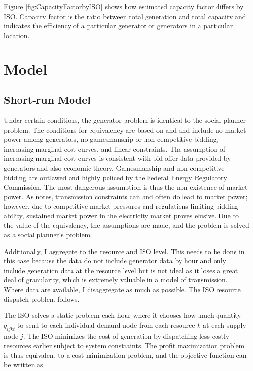 \documentclass[12pt]{article}
\begin{document}
Figure \ref{fig:CapacityFactorbyISO} shows how estimated capacity factor differs by ISO. Capacity factor is the ratio between total generation and total capacity and indicates the efficiency of a particular generator or generators in a particular location.

\section{Model} \label{sec:Model}

\subsection{Short-run Model}

Under certain conditions, the generator problem is identical to the social planner problem. The conditions for equivalency are based on \cite{gilbert2004allocating} and \cite{cramton2017electricity} and include no market power among generators, no gamesmanship or non-competitive bidding, increasing marginal cost curves, and linear constraints. The assumption of increasing marginal cost curves is consistent with bid offer data provided by generators and also economic theory. Gamesmanship and non-competitive bidding are outlawed and highly policed by the Federal Energy Regulatory Commission. The most dangerous assumption is thus the non-existence of market power. As \cite{gilbert2004allocating} notes, transmission constraints can and often do lead to market power; however, due to competitive market pressures and regulations limiting bidding ability, sustained market power in the electricity market proves elusive. Due to the value of the equivalency, the assumptions are made, and the problem is solved as a social planner's problem.

Additionally, I aggregate to the resource and ISO level. This needs to be done in this case because the data do not include generator data by hour and only include generation data at the resource level but is not ideal as it loses a great deal of granularity, which is extremely valuable in a model of transmission. Where data are available, I disaggregate as much as possible. The ISO resource dispatch problem follows.

The ISO solves a static problem each hour where it chooses how much quantity $q_{ijkt}$ to send to each individual demand node from each resource $k$ at each supply node $j$. The ISO minimizes the cost of generation by dispatching less costly resources earlier subject to system constraints. The profit maximization problem is thus equivalent to a cost minimization problem, and the objective function can be written as
\end{document}
